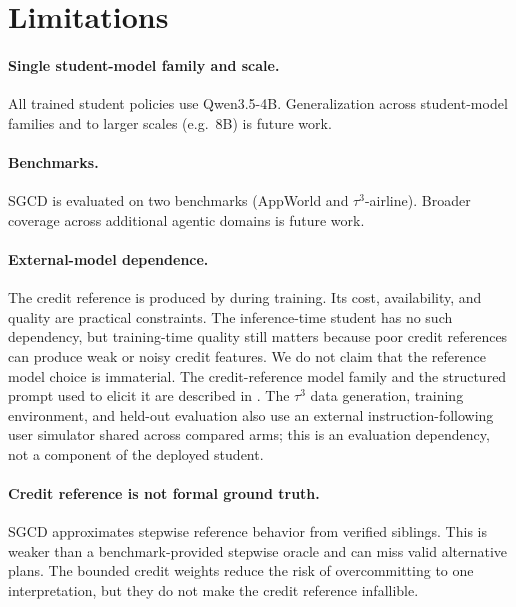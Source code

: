 \section*{Limitations}
\label{sec:limitations}

\paragraph{Single student-model family and scale.} All trained student policies
use Qwen3.5-4B. Generalization across student-model families and to larger scales
(e.g.\ 8B) is future work.

\paragraph{Benchmarks.} SGCD is evaluated on two benchmarks (AppWorld and
$\tau^3$-airline). Broader coverage across additional agentic domains is future
work.

\paragraph{External-model dependence.} The credit reference is
produced by \creditreferenceproviderphrase{} during training. Its cost,
availability, and quality are practical constraints. The inference-time student has no
such dependency, but training-time quality still matters because poor credit
references can produce weak or noisy credit features. We do not claim that the
reference model choice is immaterial. The credit-reference model family and the
structured prompt used to elicit it are described in . The
$\tau^3$ data generation, training environment, and held-out evaluation also use
an external instruction-following user simulator shared across compared arms;
this is an evaluation dependency, not a component of the deployed student.

\paragraph{Credit reference is not formal ground truth.} SGCD approximates
stepwise reference behavior from verified siblings. This is weaker than a
benchmark-provided stepwise oracle and can miss valid alternative plans. The
bounded credit weights reduce the risk of overcommitting to one interpretation,
but they do not make the credit reference infallible.


